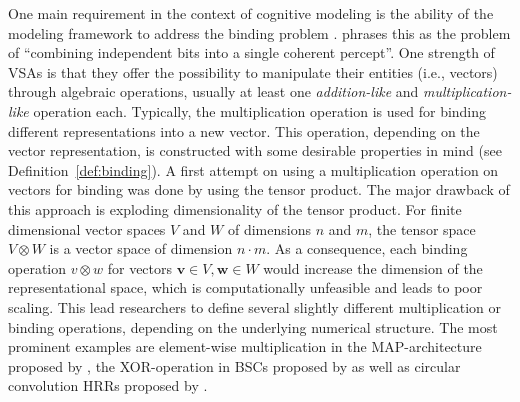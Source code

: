 One main requirement in the context of cognitive modeling is the ability of the modeling framework to address the binding problem \parencite{Treisman1999}.
\textcite{Jackendoff2002} phrases this as the problem of \enquote{combining independent bits into a single coherent percept}.
One strength of \acp{VSA} is that they offer the possibility to manipulate their entities (i.e., vectors) through algebraic operations, usually at least one \emph{addition-like} and \emph{multiplication-like} operation each.
Typically, the multiplication operation is used for binding different representations into a new vector.
This operation, depending on the vector representation, is constructed with some desirable properties in mind (see Definition~\ref{def:binding}).
A first attempt on using a multiplication operation on vectors for binding was done by \textcite{Smolensky1990} using the tensor product.
The major drawback of this approach is exploding dimensionality of the tensor product.
For finite dimensional vector spaces  $V$ and $W$ of dimensions $n$ and $m$, the tensor space $V \otimes W$ is a vector space of dimension $n\cdot m$.
As a consequence, each binding operation $v\otimes w$ for vectors $ \mathbf{v} \in V, \mathbf{w} \in W$ would increase the dimension of the representational space, which is computationally unfeasible and leads to poor scaling.
This lead researchers to define several slightly different multiplication or binding operations, depending on the underlying numerical structure.
The most prominent examples are element-wise multiplication in the \ac{MAP}-architecture proposed by \textcite{Gayler1998}, the XOR-operation in \acp{BSC} proposed by \textcite{Kanerva2000, Kanerva2009} as well as circular convolution \acp{HRR} proposed by \textcite{Plate1991, Plate1994}.

